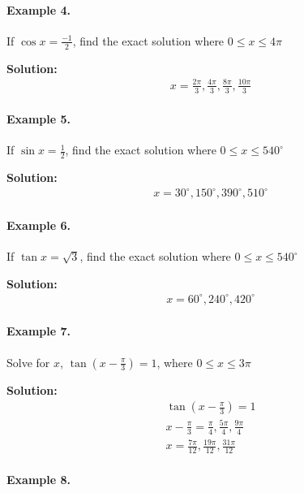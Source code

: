 \documentclass{article}
\begin{document}
\paragraph{Example 4.}

If $\cos x = \frac{-1}{2}$, find the exact solution where $0 \leq x \leq 4\pi$

{\scriptsize \textbf{Solution:}}
\[
  \begin{aligned}
    x = \frac{2\pi}{3}, \frac{4\pi}{3}, \frac{8\pi}{3}, \frac{10\pi}{3}
  \end{aligned}
\]

\paragraph{Example 5.}

If $\sin x = \frac{1}{2}$, find the exact solution where $0 \leq x \leq 540^{\circ}$

{\scriptsize \textbf{Solution:}}
\[
  \begin{aligned}
    x = 30^{\circ}, 150^{\circ}, 390^{\circ}, 510^{\circ}
  \end{aligned}
\]

\paragraph{Example 6.}

If $\tan x = \sqrt{3}$, find the exact solution where $0 \leq x \leq 540^{\circ}$

{\scriptsize \textbf{Solution:}}
\[
  \begin{aligned}
    x = 60^{\circ}, 240^{\circ}, 420^{\circ}
  \end{aligned}
\]

\paragraph{Example 7.}

Solve for $x$, $\tan(x-\frac{\pi}{3}) = 1$, where $0 \leq x \leq 3\pi$

{\scriptsize \textbf{Solution:}}
\[
  \begin{aligned}
    \tan(x-\frac{\pi}{3}) = 1 \\
    x - \frac{\pi}{3} = \frac{\pi}{4}, \frac{5\pi}{4}, \frac{9\pi}{4} \\
    x = \frac{7\pi}{12}, \frac{19\pi}{12}, \frac{31\pi}{12}
  \end{aligned}
\]

\paragraph{Example 8.}
\end{document}
